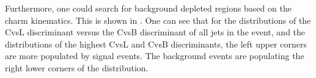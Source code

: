 Furthermore, one could search for background depleted regions based on the charm kinematics. This is shown in . One can see that for the distributions of the CvsL discriminant versus the CvsB discriminant of all jets in the event, and the distributions of the highest CvsL and CvsB discriminants, the left upper corners are more populated by signal events. The background events are populating the right lower corners of the distribution. 

